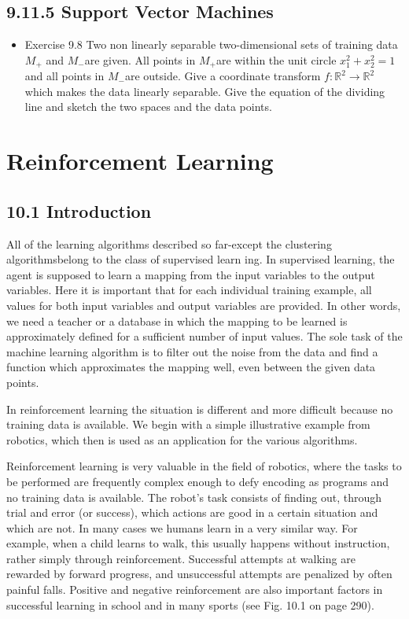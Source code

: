 \documentclass[10pt]{article}
\begin{document}
\subsection*{9.11.5 Support Vector Machines}
\begin{itemize}
  \item Exercise 9.8 Two non linearly separable two-dimensional sets of training data $M_{+}$ and $M_{-}$are given. All points in $M_{+}$are within the unit circle $x_{1}^{2}+x_{2}^{2}=1$ and all points in $M_{-}$are outside. Give a coordinate transform $f: \mathbb{R}^{2} \rightarrow \mathbb{R}^{2}$ which makes the data linearly separable. Give the equation of the dividing line and sketch the two spaces and the data points.
\end{itemize}

\section*{Reinforcement Learning}
\subsection*{10.1 Introduction}
All of the learning algorithms described so far-except the clustering algorithmsbelong to the class of supervised learn
ing. In supervised learning, the agent is supposed to learn a mapping from the input variables to the output variables. Here it is important that for each individual training example, all values for both input variables and output variables are provided. In other words, we need a teacher or a database in which the mapping to be learned is approximately defined for a sufficient number of input values. The sole task of the machine learning algorithm is to filter out the noise from the data and find a function which approximates the mapping well, even between the given data points.

In reinforcement learning the situation is different and more difficult because no training data is available. We begin with a simple illustrative example from robotics, which then is used as an application for the various algorithms.

Reinforcement learning is very valuable in the field of robotics, where the tasks to be performed are frequently complex enough to defy encoding as programs and no training data is available. The robot's task consists of finding out, through trial and error (or success), which actions are good in a certain situation and which are not. In many cases we humans learn in a very similar way. For example, when a child learns to walk, this usually happens without instruction, rather simply through reinforcement. Successful attempts at walking are rewarded by forward progress, and unsuccessful attempts are penalized by often painful falls. Positive and negative reinforcement are also important factors in successful learning in school and in many sports (see Fig. 10.1 on page 290).
\end{document}
